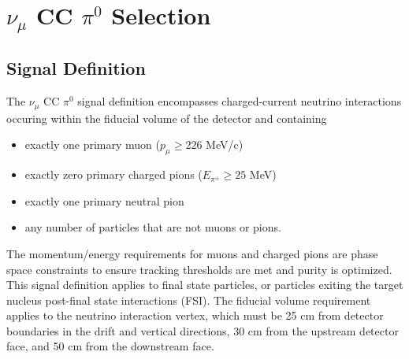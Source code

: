 \documentclass[../main.tex]{subfiles}
\begin{document}
\section{$\nu_{\mu}$ CC $\pi^{0}$ Selection}
\label{sec:selection}


\subsection{Signal Definition}
The $\nu_{\mu}$ CC $\pi^{0}$ signal definition encompasses charged-current neutrino interactions occuring within the fiducial volume of the detector and containing
\begin{itemize}
    \item exactly one primary muon ($p_{\mu} \ge 226$ MeV/c)
    \item exactly zero primary charged pions ($E_{\pi^{\pm}} \ge 25$ MeV)
    \item exactly one primary neutral pion
    \item any number of particles that are not muons or pions.
\end{itemize}
The momentum/energy requirements for muons and charged pions are phase space constraints to ensure tracking thresholds are met and purity is optimized.  This signal definition applies to final state particles, or particles exiting the target nucleus post-final state interactions (FSI).  The fiducial volume requirement applies to the neutrino interaction vertex, which must be 25 cm from detector boundaries in the drift and vertical directions, 30 cm from the upstream detector face, and 50 cm from the downstream face.
\end{document}
